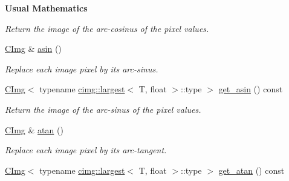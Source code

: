 \begin{Indent}{\bf Usual Mathematics}
\begin{DoxyCompactItemize}
\begin{DoxyCompactList}\small\item\em Return the image of the arc-\/cosinus of the pixel values. \item\end{DoxyCompactList}\item 
\hypertarget{structcimg__library_1_1_c_img_a4275abf989c98e113d046b03a55862bb}{
\hyperlink{structcimg__library_1_1_c_img}{CImg} \& \hyperlink{structcimg__library_1_1_c_img_a4275abf989c98e113d046b03a55862bb}{asin} ()}
\label{structcimg__library_1_1_c_img_a4275abf989c98e113d046b03a55862bb}

\begin{DoxyCompactList}\small\item\em Replace each image pixel by its arc-\/sinus. \item\end{DoxyCompactList}\item 
\hypertarget{structcimg__library_1_1_c_img_a7476e0f8782cb1adefd996a8c17b7625}{
\hyperlink{structcimg__library_1_1_c_img}{CImg}$<$ typename \hyperlink{structcimg__library_1_1cimg_1_1largest}{cimg::largest}$<$ T, float $>$::type $>$ \hyperlink{structcimg__library_1_1_c_img_a7476e0f8782cb1adefd996a8c17b7625}{get\_\-asin} () const }
\label{structcimg__library_1_1_c_img_a7476e0f8782cb1adefd996a8c17b7625}

\begin{DoxyCompactList}\small\item\em Return the image of the arc-\/sinus of the pixel values. \item\end{DoxyCompactList}\item 
\hypertarget{structcimg__library_1_1_c_img_aeb862973f2dc1409d7f512a6b1451748}{
\hyperlink{structcimg__library_1_1_c_img}{CImg} \& \hyperlink{structcimg__library_1_1_c_img_aeb862973f2dc1409d7f512a6b1451748}{atan} ()}
\label{structcimg__library_1_1_c_img_aeb862973f2dc1409d7f512a6b1451748}

\begin{DoxyCompactList}\small\item\em Replace each image pixel by its arc-\/tangent. \item\end{DoxyCompactList}\item 
\hypertarget{structcimg__library_1_1_c_img_ab843c3cf46348a9000fda81ce176952a}{
\hyperlink{structcimg__library_1_1_c_img}{CImg}$<$ typename \hyperlink{structcimg__library_1_1cimg_1_1largest}{cimg::largest}$<$ T, float $>$::type $>$ \hyperlink{structcimg__library_1_1_c_img_ab843c3cf46348a9000fda81ce176952a}{get\_\-atan} () const }
\label{structcimg__library_1_1_c_img_ab843c3cf46348a9000fda81ce176952a}


\end{DoxyCompactItemize}
\end{Indent}
